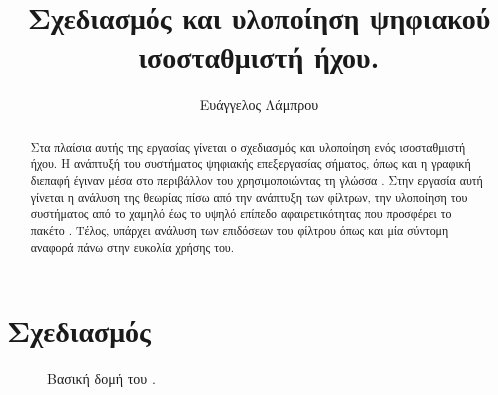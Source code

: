 \documentclass{article}
\begin{document}
\begin{titlepage}

\title{Σχεδιασμός και υλοποίηση ψηφιακού ισοσταθμιστή ήχου.}

\author{Ευάγγελος Λάμπρου}
\date{}

\maketitle

\begin{abstract}
    Στα πλαίσια αυτής της εργασίας γίνεται ο σχεδιασμός και υλοποίηση 
    ενός ισοσταθμιστή ήχου. 
    Η ανάπτυξή του συστήματος ψηφιακής επεξεργασίας σήματος, όπως 
    και η γραφική διεπαφή έγιναν μέσα στο περιβάλλον του 
     χρησιμοποιώντας τη γλώσσα . 
    Στην εργασία αυτή γίνεται η ανάλυση της θεωρίας πίσω από την ανάπτυξη των φίλτρων, 
    την υλοποίηση του συστήματος από το χαμηλό έως το υψηλό επίπεδο αφαιρετικότητας που 
    προσφέρει το πακέτο . 
    Τέλος, υπάρχει ανάλυση των επιδόσεων του φίλτρου όπως και μία σύντομη αναφορά πάνω 
    στην ευκολία χρήσης του.
\end{abstract}


\end{titlepage}

\linenumbers

\section{Σχεδιασμός}

\begin{figure}[htpb]

    \begin{center}

    \end{center}

    \caption{Βασική δομή του .} 
\end{figure}
\end{document}
